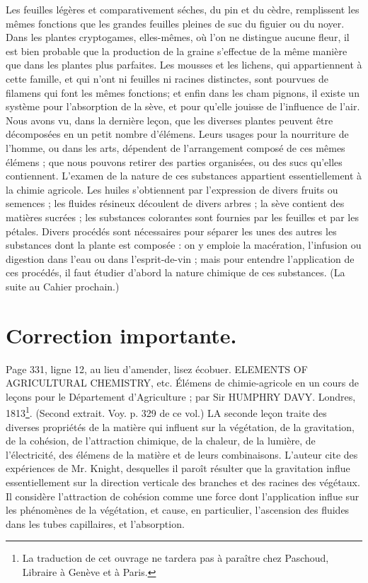 Les feuilles légères et comparativement séches, du pin et du cèdre, remplissent les mêmes fonctions que les grandes feuilles pleines de suc du figuier ou du noyer.
Dans les plantes cryptogames, elles-mêmes, où l'on ne distingue aucune fleur, il est bien probable que la production de la graine s'effectue de la même manière que dans les plantes plus parfaites. Les mousses et les lichens, qui appartiennent à cette famille, et qui n'ont ni feuilles ni racines distinctes, sont pourvues de filamens qui font les mêmes fonctions; et enfin dans les cham\setcounter{page}{393} pignons, il existe un système pour l'absorption de la sève, et pour qu'elle jouisse de l'influence de l'air.
Nous avons vu, dans la dernière leçon, que les diverses plantes peuvent être décomposées en un petit nombre d'élémens. Leurs usages pour la nourriture de l'homme, ou dans les arts, dépendent de l'arrangement composé de ces mêmes élémens ; que nous pouvons retirer des parties organisées, ou des sucs qu'elles contiennent. L'examen de la nature de ces substances appartient essentiellement à la chimie agricole.
Les huiles s'obtiennent par l'expression de divers fruits ou semences ; les fluides résineux découlent de divers arbres ; la sève contient des matières sucrées ; les substances colorantes sont fournies par les feuilles et par les pétales. Divers procédés sont nécessaires pour séparer les unes des autres les substances dont la plante est composée : on y emploie la macération, l'infusion ou digestion dans l'eau ou dans l'esprit-de-vin ; mais pour entendre l'application de ces procédés, il faut étudier d'abord la nature chimique de ces substances.
(La suite au Cahier prochain.)
\section{Correction importante.}
Page 331, ligne 12, au lieu d'amender, lisez écobuer.\setcounter{page}{394} ELEMENTS OF AGRICULTURAL CHEMISTRY, etc. Élémens de chimie-agricole en un cours de leçons pour le Département d'Agriculture ; par Sir HUMPHRY DAVY. Londres, 1813\footnote{La traduction de cet ouvrage ne tardera pas à paraître chez Paschoud, Libraire à Genève et à Paris.}. (Second extrait. Voy. p. 329 de ce vol.)
LA seconde leçon traite des diverses propriétés de la matière qui influent sur la végétation, de la gravitation, de la cohésion, de l'attraction chimique, de la chaleur, de la lumière, de l'électricité, des élémens de la matière et de leurs combinaisons. L'auteur cite des expériences de Mr. Knight, desquelles il paroît résulter que la gravitation influe essentiellement sur la direction verticale des branches et des racines des végétaux. Il considère l'attraction de cohésion comme une force dont l'application influe sur les phénomènes de la végétation, et cause, en particulier, l'ascension des fluides dans les tubes capillaires, et l'absorption.